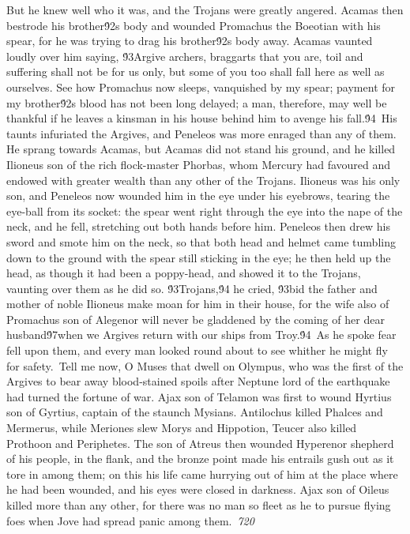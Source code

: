 {But he knew well who it was, and the Trojans were greatly angered. Acamas then bestrode his brother\'92s body and wounded Promachus the Boeotian with his spear, for he was trying to drag his brother\'92s body away. Acamas vaunted loudly over him saying, \'93Argive archers, braggarts that you are, toil and suffering shall not be for us only, but some of you too shall fall here as well as ourselves. See how Promachus now sleeps, vanquished by my spear; payment for my brother\'92s blood has not been long delayed; a man, therefore, may well be thankful if he leaves a kinsman in his house behind him to avenge his fall.\'94\
His taunts infuriated the Argives, and Peneleos was more enraged than any of them. He sprang towards Acamas, but Acamas did not stand his ground, and he killed Ilioneus son of the rich flock-master Phorbas, whom Mercury had favoured and endowed with greater wealth than any other of the Trojans. Ilioneus was his only son, and Peneleos now wounded him in the eye under his eyebrows, tearing the eye-ball from its socket: the spear went right through the eye into the nape of the neck, and he fell, stretching out both hands before him. Peneleos then drew his sword and smote him on the neck, so that both head and helmet came tumbling down to the ground with the spear still sticking in the eye; he then held up the head, as though it had been a poppy-head, and showed it to the Trojans, vaunting over them as he did so. \'93Trojans,\'94 he cried, \'93bid the father and mother of noble Ilioneus make moan for him in their house, for the wife also of Promachus son of Alegenor will never be gladdened by the coming of her dear husband\'97when we Argives return with our ships from Troy.\'94\
As he spoke fear fell upon them, and every man looked round about to see whither he might fly for safety.\
Tell me now, O Muses that dwell on Olympus, who was the first of the Argives to bear away blood-stained spoils after Neptune lord of the earthquake had turned the fortune of war. Ajax son of Telamon was first to wound Hyrtius son of Gyrtius, captain of the staunch Mysians. Antilochus killed Phalces and Mermerus, while Meriones slew Morys and Hippotion, Teucer also killed Prothoon and Periphetes. The son of Atreus then wounded Hyperenor shepherd of his people, in the flank, and the bronze point made his entrails gush out as it tore in among them; on this his life came hurrying out of him at the place where he had been wounded, and his eyes were closed in darkness. Ajax son of Oileus killed more than any other, for there was no man so fleet as he to pursue flying foes when Jove had spread panic among them.\
\pard{}\sl720\qc{}

}
